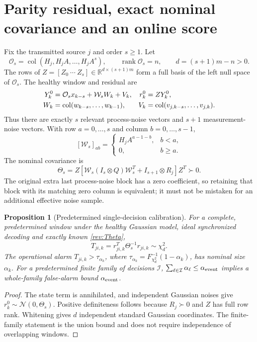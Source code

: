 \documentclass[11pt,a4paper]{article}
\newtheorem{proposition}{Proposition}
\DeclareMathOperator{\col}{col}
\DeclareMathOperator{\rank}{rank}
\newcommand{\R}{\mathbb R}
\begin{document}
\section{Parity residual, exact nominal covariance and an online score}
\label{rev:scoresection}
Fix the transmitted source $j$ and order $s\ge1$. Let
\[
 \mathcal O_s=\col(H_j,H_jA,\ldots,H_jA^s),\qquad
 \rank\mathcal O_s=n,\qquad d=(s+1)m-n>0.
\]
The rows of $Z=[Z_0\ \cdots\ Z_s]\in\R^{d\times(s+1)m}$
form a full basis of the left null space of $\mathcal O_s$.
The healthy window and residual are
\begin{align}
 Y_k^0&=\mathcal O_s x_{k-s}+\mathcal W_s W_k+V_k,&
 r_k^0&=ZY_k^0,\label{rev:window}\\
 W_k&=\col(w_{k-s},\ldots,w_{k-1}),&
 V_k&=\col(v_{j,k-s},\ldots,v_{j,k}).\notag
\end{align}
Thus there are exactly $s$ relevant process-noise vectors and $s+1$
measurement-noise vectors. With row $a=0,\ldots,s$ and column
$b=0,\ldots,s-1$,
\[
 [\mathcal W_s]_{ab}=
 \begin{cases}H_jA^{a-1-b},&b<a,\\0,&b\ge a.\end{cases}
\]
The nominal covariance is
\begin{equation}
 \Theta_s=Z[\mathcal W_s(I_s\otimes Q)\mathcal W_s^T
           +I_{s+1}\otimes R_j]Z^T\succ0.\label{rev:Theta}
\end{equation}
The original extra last process-noise block has a zero coefficient,
so retaining that block with its matching zero column is equivalent;
it must not be mistaken for an additional effective noise sample.

\begin{proposition}[Predetermined single-decision calibration]
\label{rev:calibration}
For a complete, predetermined window under the healthy Gaussian model,
ideal synchronized decoding and exactly known \eqref{rev:Theta},
\begin{equation}
 T_{ji,k}=r_{ji,k}^T\Theta_s^{-1}r_{ji,k}\sim\chi_d^2.
 \label{rev:score}
\end{equation}
The operational alarm $T_{ji,k}>\tau_{\alpha_k}$, where
$\tau_{\alpha_k}=F_{\chi_d^2}^{-1}(1-\alpha_k)$, has nominal size
$\alpha_k$. For a predetermined finite family of decisions $\mathcal I$,
$\sum_{\ell\in\mathcal I}\alpha_\ell\le\alpha_{\rm event}$
implies a whole-family false-alarm bound $\alpha_{\rm event}$.
\end{proposition}
\begin{proof}
The state term is annihilated, and independent Gaussian noises give
$r_k^0\sim\mathcal N(0,\Theta_s)$. Positive definiteness follows because
$R_j\succ0$ and $Z$ has full row rank. Whitening gives $d$ independent
standard Gaussian coordinates. The finite-family statement is the union
bound and does not require independence of overlapping windows.
\end{proof}
\end{document}
